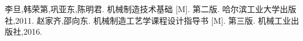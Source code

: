 \begin{thebibliography}{99}
	 李旦,韩荣第,巩亚东,陈明君. 机械制造技术基础 [M]. 第二版. 哈尔滨工业大学出版社,2011.
	 赵家齐,邵向东. 机械制造工艺学课程设计指导书 [M]. 第三版. 机械工业出版社,2016.
\end{thebibliography}
